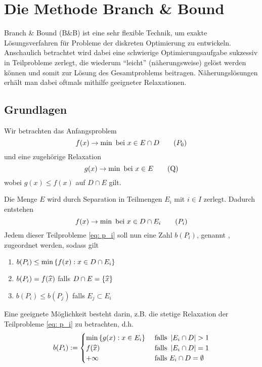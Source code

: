 \section{Die Methode Branch \& Bound}

Branch \& Bound (B\&B) ist eine sehr flexible Technik, um exakte Lösungsverfahren für Probleme der diskreten Optimierung zu entwickeln. Anschaulich betrachtet wird dabei eine schwierige Optimierungsaufgabe sukzessiv in Teilprobleme zerlegt, die wiederum \enquote{leicht} (näherungsweise) gelöst werden können und somit zur Lösung des Gesamtproblems beitragen. Näherungslösungen erhält man dabei oftmals mithilfe geeigneter Relaxationen.

\subsection{Grundlagen}

Wir betrachten das Anfangsproblem
\begin{equation*}
	f(x) \to \min \text{ bei } x \in E \cap D
	\tag{$P_0$}
	\label{eq: p_0}
\end{equation*}
und eine zugehörige Relaxation
\begin{equation*}
	g(x) \to \min \text{ bei } x \in E
	\tag{Q}
	\label{eq: q}
\end{equation*}
wobei $g(x) \le f(x)$ auf $D \cap E$ gilt.

\vspace{\parskip}

Die Menge $E$ wird durch Separation in Teilmengen $E_i$ mit $i \in I$ zerlegt. Dadurch entstehen  
\begin{equation*}
	f(x) \to \min \text{ bei } x \in D \cap E_i
	\tag{$P_i$}
	\label{eq: p_i}
\end{equation*}
Jedem dieser Teilprobleme \eqref{eq: p_i} soll nun eine Zahl $b(P_i)$, genannt , zugeordnet werden, sodass gilt
\begin{enumerate}[label=(\alph*), nolistsep]
	\item $b(P_i) \le \min\left\{ f(x) : x \in D \cap E_i \right\}$
	\item $b(P_i) = f(\widehat{x})$ falls $D \cap E = \left\{ \widehat{x} \right\}$
	\item $b(P_i) \le b(P_j)$ falls $E_j \subset E_i$
\end{enumerate}

Eine geeignete Möglichkeit besteht darin, z.B. die stetige Relaxation der Teilprobleme \eqref{eq: p_i} zu betrachten, d.h. 
\begin{equation*}
	b(P_i) \mathrel{:=} \begin{cases}
	\min\left\{ g(x) : x \in E_i \right\} & \text{ falls } \left| E_i \cap D \right| > 1 \\
	f(\widehat{x}) & \text{ falls } \left| E_i \cap D \right| = 1 \\
	+ \infty & \text{ falls } E_i \cap D = \emptyset
	\end{cases}
\end{equation*}

